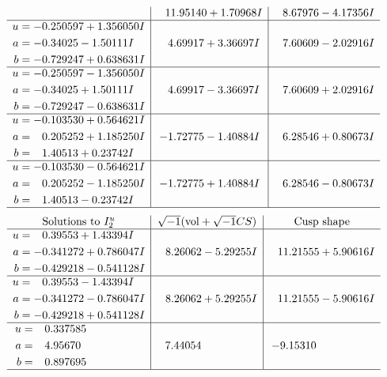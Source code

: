 \documentclass[1p]{elsarticle_modified}
\theoremstyle{definition}
\newcommand{\I}{\sqrt{-1}}
\begin{document}
$$\begin{array}{c|c|c}
 & \phantom{-}11.95140 + 1.70968 I & \phantom{-}8.67976 - 4.17356 I \\ \hline\begin{aligned}
u &= -0.250597 + 1.356050 I \\
a &= -0.34025 - 1.50111 I \\
b &= -0.729247 + 0.638631 I\end{aligned}
 & \phantom{-}4.69917 + 3.36697 I & \phantom{-}7.60609 - 2.02916 I \\ \hline\begin{aligned}
u &= -0.250597 - 1.356050 I \\
a &= -0.34025 + 1.50111 I \\
b &= -0.729247 - 0.638631 I\end{aligned}
 & \phantom{-}4.69917 - 3.36697 I & \phantom{-}7.60609 + 2.02916 I \\ \hline\begin{aligned}
u &= -0.103530 + 0.564621 I \\
a &= \phantom{-}0.205252 + 1.185250 I \\
b &= \phantom{-}1.40513 + 0.23742 I\end{aligned}
 & -1.72775 - 1.40884 I & \phantom{-}6.28546 + 0.80673 I \\ \hline\begin{aligned}
u &= -0.103530 - 0.564621 I \\
a &= \phantom{-}0.205252 - 1.185250 I \\
b &= \phantom{-}1.40513 - 0.23742 I\end{aligned}
 & -1.72775 + 1.40884 I & \phantom{-}6.28546 - 0.80673 I\\
 \hline 
 \end{array}$$\newpage$$\begin{array}{c|c|c}  
\text{Solutions to }I^u_{2}& \I (\text{vol} + \sqrt{-1}CS) & \text{Cusp shape}\\
 \hline 
\begin{aligned}
u &= \phantom{-}0.39553 + 1.43394 I \\
a &= -0.341272 + 0.786047 I \\
b &= -0.429218 - 0.541128 I\end{aligned}
 & \phantom{-}8.26062 - 5.29255 I & \phantom{-}11.21555 + 5.90616 I \\ \hline\begin{aligned}
u &= \phantom{-}0.39553 - 1.43394 I \\
a &= -0.341272 - 0.786047 I \\
b &= -0.429218 + 0.541128 I\end{aligned}
 & \phantom{-}8.26062 + 5.29255 I & \phantom{-}11.21555 - 5.90616 I \\ \hline\begin{aligned}
u &= \phantom{-}0.337585\phantom{ +0.000000I} \\
a &= \phantom{-}4.95670\phantom{ +0.000000I} \\
b &= \phantom{-}0.897695\phantom{ +0.000000I}\end{aligned}
 & \phantom{-}7.44054\phantom{ +0.000000I} & -9.15310\phantom{ +0.000000I}\\
 \hline 
 \end{array}$$\newpage\newpage\renewcommand{\arraystretch}{1}
\end{document}
